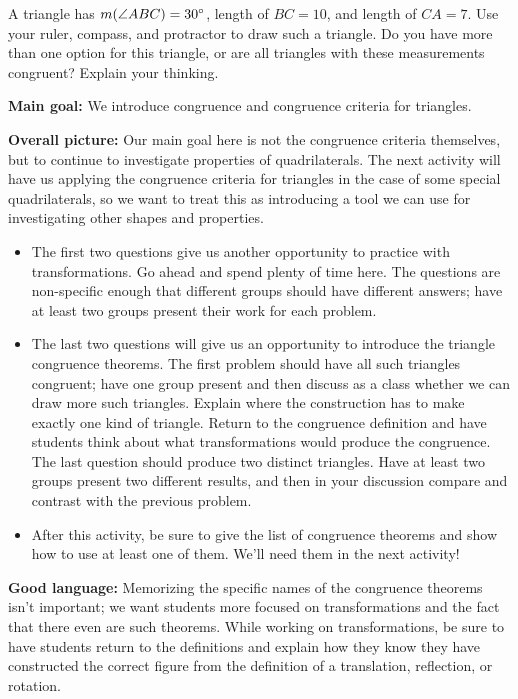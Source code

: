 \documentclass{ximera}
\begin{document}
\begin{problem}
A triangle has $m(\angle ABC) = 30\degree$, length of $BC = 10$, and length of $CA = 7$. Use your ruler, compass, and protractor to draw such a triangle. Do you have more than one option for this triangle, or are all triangles with these measurements congruent? Explain your thinking.
\end{problem}


\newpage

\begin{instructorNotes}

{\bf Main goal:} We introduce congruence and congruence criteria for triangles.

{\bf Overall picture:} Our main goal here is not the congruence criteria themselves, but to continue to investigate properties of quadrilaterals. The next activity will have us applying the congruence criteria for triangles in the case of some special quadrilaterals, so we want to treat this as introducing a tool we can use for investigating other shapes and properties.
 
\begin{itemize}
	\item The first two questions give us another opportunity to practice with transformations. Go ahead and spend plenty of time here. The questions are non-specific enough that different groups should have different answers; have at least two groups present their work for each problem.
	\item The last two questions will give us an opportunity to introduce the triangle congruence theorems. The first problem should have all such triangles congruent; have one group present and then discuss as a class whether we can draw more such triangles. Explain where the construction has to make exactly one kind of triangle. Return to the congruence definition and have students think about what transformations would produce the congruence. The last question should produce two distinct triangles. Have at least two groups present two different results, and then in your discussion compare and contrast with the previous problem.
	\item After this activity, be sure to give the list of congruence theorems and show how to use at least one of them. We'll need them in the next activity!
\end{itemize}

{\bf Good language:} Memorizing the specific names of the congruence theorems isn't important; we want students more focused on transformations and the fact that there even are such theorems. While working on transformations, be sure to have students return to the definitions and explain how they know they have constructed the correct figure from the definition of a translation, reflection, or rotation.


\end{instructorNotes}
\end{document}
